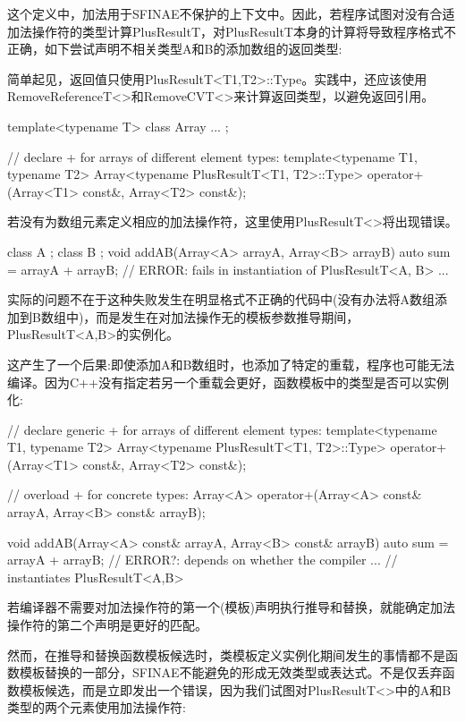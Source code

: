 这个定义中，加法用于SFINAE不保护的上下文中。因此，若程序试图对没有合适加法操作符的类型计算PlusResultT，对PlusResultT本身的计算将导致程序格式不正确，如下尝试声明不相关类型A和B的添加数组的返回类型:

\begin{notice}简单起见，返回值只使用PlusResultT<T1,T2>::Type。实践中，还应该使用RemoveReferenceT<>和RemoveCVT<>来计算返回类型，以避免返回引用。
\end{notice}

\begin{cpp}
template<typename T>
class Array {
	...
};

// declare + for arrays of different element types:
template<typename T1, typename T2>
Array<typename PlusResultT<T1, T2>::Type>
operator+ (Array<T1> const&, Array<T2> const&);
\end{cpp}

若没有为数组元素定义相应的加法操作符，这里使用PlusResultT<>将出现错误。

\begin{cpp}
class A {
};
class B {
};
void addAB(Array<A> arrayA, Array<B> arrayB) {
	auto sum = arrayA + arrayB; // ERROR: fails in instantiation of PlusResultT<A, B>
	...
}
\end{cpp}

实际的问题不在于这种失败发生在明显格式不正确的代码中(没有办法将A数组添加到B数组中)，而是发生在对加法操作无的模板参数推导期间，PlusResultT<A,B>的实例化。

这产生了一个后果:即使添加A和B数组时，也添加了特定的重载，程序也可能无法编译。因为C++没有指定若另一个重载会更好，函数模板中的类型是否可以实例化:

\begin{cpp}
// declare generic + for arrays of different element types:
template<typename T1, typename T2>
Array<typename PlusResultT<T1, T2>::Type>
operator+ (Array<T1> const&, Array<T2> const&);

// overload + for concrete types:
Array<A> operator+(Array<A> const& arrayA, Array<B> const& arrayB);

void addAB(Array<A> const& arrayA, Array<B> const& arrayB) {
	auto sum = arrayA + arrayB; // ERROR?: depends on whether the compiler
	... // instantiates PlusResultT<A,B>
}
\end{cpp}

若编译器不需要对加法操作符的第一个(模板)声明执行推导和替换，就能确定加法操作符的第二个声明是更好的匹配。

然而，在推导和替换函数模板候选时，类模板定义实例化期间发生的事情都不是函数模板替换的一部分，SFINAE不能避免的形成无效类型或表达式。不是仅丢弃函数模板候选，而是立即发出一个错误，因为我们试图对PlusResultT<>中的A和B类型的两个元素使用加法操作符:

